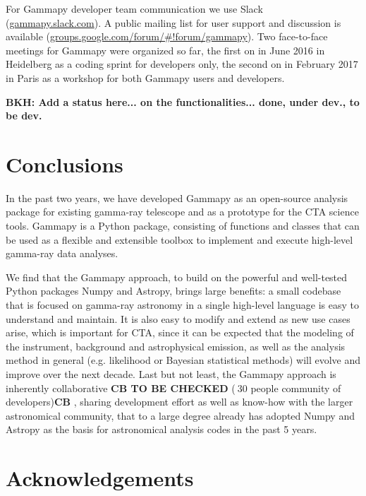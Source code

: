 \documentclass{PoS}
\newcommand{\urlGammapySlack}{\href{https://gammapy.slack.com}{gammapy.slack.com}}
\newcommand{\urlGammapyForum}{\href{https://groups.google.com/forum/\#!forum/gammapy}{groups.google.com/forum/\#!forum/gammapy}}
\begin{document}
For Gammapy developer team communication we use Slack (\urlGammapySlack). A
public mailing list for user support and discussion is available
(\urlGammapyForum). Two face-to-face meetings for Gammapy were organized so far,
the first on in June 2016 in Heidelberg as a coding sprint for developers only,
the second on in February 2017 in Paris as a workshop for both Gammapy users and
developers.


{\bf BKH: Add a status here... on the functionalities... done, under dev., to be dev.}

\section{Conclusions}
\label{sec:conclusions}

In the past two years, we have developed Gammapy as an open-source analysis
package for existing gamma-ray telescope and as a prototype for the CTA science
tools. Gammapy is a Python package, consisting of functions and classes that can
be used as a flexible and extensible toolbox to implement and execute high-level
gamma-ray data analyses.

We find that the Gammapy approach, to build on the powerful and well-tested
Python packages Numpy and Astropy, brings large benefits: a small codebase that
is focused on gamma-ray astronomy in a single high-level language is easy to
understand and maintain. It is also easy to modify and extend as new use cases
arise, which is important for CTA, since it can be expected that the modeling of
the instrument, background and astrophysical emission, as well as the analysis
method in general (e.g. likelihood or Bayesian statistical methods) will evolve
and improve over the next decade. Last but not least, the Gammapy approach is
inherently collaborative {\bf CB TO BE CHECKED }($~$30 people community of developers){\bf CB }, 
sharing development effort as well as know-how with the larger astronomical community, 
that to a large degree already has adopted
Numpy and Astropy as the basis for astronomical analysis codes in the past 5
years.

\section{Acknowledgements}
\label{sed:acknowledgements}
\end{document}
